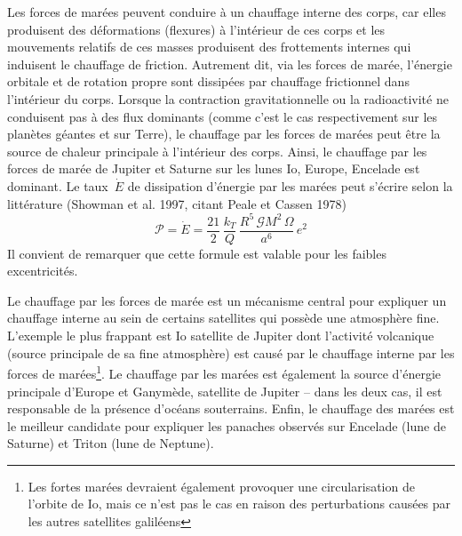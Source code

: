 

\sk
Les forces de marées peuvent conduire à un chauffage interne des corps,
car elles produisent des déformations (flexures) à l'intérieur de ces corps
et les mouvements relatifs de ces masses produisent des frottements internes
qui induisent le chauffage de friction.
Autrement dit, via les forces de marée, l'énergie orbitale et de rotation propre sont dissipées par chauffage frictionnel dans l'intérieur du corps.
Lorsque la contraction gravitationnelle ou la radioactivité ne conduisent
pas à des flux dominants (comme c'est le cas respectivement sur les planètes géantes et sur Terre),
le chauffage par les forces de marées
peut être la source de chaleur principale à l'intérieur des corps.
Ainsi, le chauffage par les forces de marée de Jupiter et Saturne sur 
les lunes Io, Europe, Encelade est dominant.
Le taux~$\dot{E}$ de dissipation d'énergie par les marées peut s'écrire
selon la littérature (Showman et al. 1997, citant Peale et Cassen 1978)
\[ \mathcal{P} = \dot{E} = \frac{21}{2} \, \frac{k_T}{Q} \, \frac{R^5\,\mathcal{G}M^2\,\Omega}{a^6} \, e^2 \]
\noindent Il convient de remarquer que cette formule est valable
pour les faibles excentricités.

\sk
Le chauffage par les forces de marée est un mécanisme central pour
expliquer un chauffage interne au sein de certains satellites
qui possède une atmosphère fine. L'exemple le plus frappant
est Io satellite de Jupiter dont l'activité volcanique
(source principale de sa fine atmosphère)
est causé par le chauffage interne par les forces de 
marées\footnote{Les fortes marées devraient également provoquer
une circularisation de l'orbite de Io, mais ce n'est pas le cas
en raison des perturbations causées par les autres satellites galiléens}.
Le chauffage par les marées est également la source d'énergie
principale d'Europe et Ganymède, satellite de Jupiter -- dans les
deux cas, il est responsable de la présence d'océans souterrains.
Enfin, le chauffage des marées est le meilleur candidate pour
expliquer les panaches observés sur Encelade (lune de Saturne)
et Triton (lune de Neptune).









